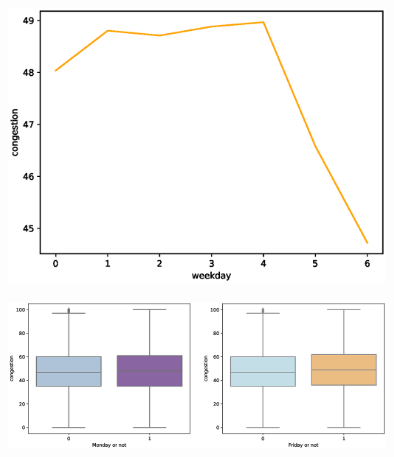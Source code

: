 \DIFdelbegin %
\DIFdelend \DIFaddbegin \begin{center}
	\begin{figure}[h]
		\setlength{\abovecaptionskip}{-0.1cm} 
		\includegraphics[width=10cm]{figure/weekday.eps}\\	
		\caption{}
		\label{weekday}
	\end{figure}
\end{center}
\DIFaddend 

\DIFdelbegin %
\DIFdelend \DIFaddbegin \begin{center}
	\DIFaddend 

	\DIFdelbegin %
\DIFdelend \DIFaddbegin \begin{figure}[htp]
	\setlength{\abovecaptionskip}{0.1cm} 
	\raggedleft
	\includegraphics[width=10cm]{figure/is_weekend.eps}
	\centering
	\caption{}
	\label{special}
	\end{figure}
\end{center}
\DIFaddend 

